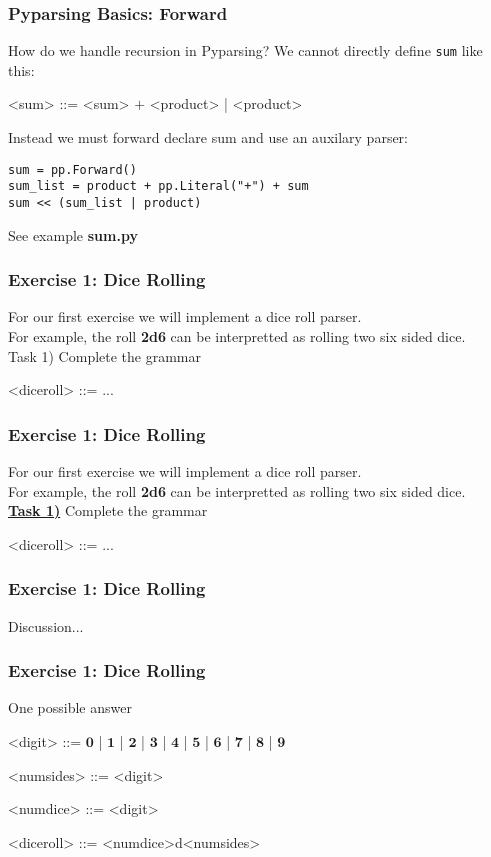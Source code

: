 \documentclass{beamer}
\begin{document}
\begin{frame}[fragile]
\frametitle{Pyparsing Basics: Forward}
How do we handle recursion in Pyparsing? We cannot directly define \texttt{sum} like this:
\medskip
\begin{grammar}
<sum> ::= <sum> $\mathbf{+}$ <product> | <product>
\end{grammar}
\medskip
Instead we must forward declare sum and use an auxilary parser:
\begin{verbatim}
sum = pp.Forward()
sum_list = product + pp.Literal("+") + sum
sum << (sum_list | product)
\end{verbatim}
See example \textbf{sum.py}
\end{frame}


\begin{frame}[fragile]
\frametitle{Exercise 1: Dice Rolling}
For our first exercise we will implement a dice roll parser. \\
\medskip
For example, the roll \textbf{2d6} can be interpretted as rolling two six sided dice. \\
\bigskip
Task 1) Complete the grammar 
\begin{grammar}
<diceroll> ::= ...
\end{grammar}
\end{frame}


\begin{frame}[fragile]
\frametitle{Exercise 1: Dice Rolling}
For our first exercise we will implement a dice roll parser. \\
\medskip
For example, the roll \textbf{2d6} can be interpretted as rolling two six sided dice. \\
\bigskip
\textbf{\underline{Task 1)}} Complete the grammar 
\medskip
\begin{grammar}
<diceroll> ::= ...
\end{grammar}
\end{frame}


\begin{frame}[fragile]
\frametitle{Exercise 1: Dice Rolling}
\begin{center}
Discussion...
\end{center}

\end{frame}

\begin{frame}[fragile]
\frametitle{Exercise 1: Dice Rolling}
One possible answer
\bigskip
\begin{grammar}
<digit> ::= $\mathbf{0}$ | $\mathbf{1}$ | $\mathbf{2}$ | $\mathbf{3}$ | $\mathbf{4}$ | $\mathbf{5}$ | $\mathbf{6}$ | $\mathbf{7}$ | $\mathbf{8}$ | $\mathbf{9}$

<numsides> ::= <digit>

<numdice> ::= <digit>

<diceroll> ::= <numdice>d<numsides>
\end{grammar}

\end{frame}
\end{document}
